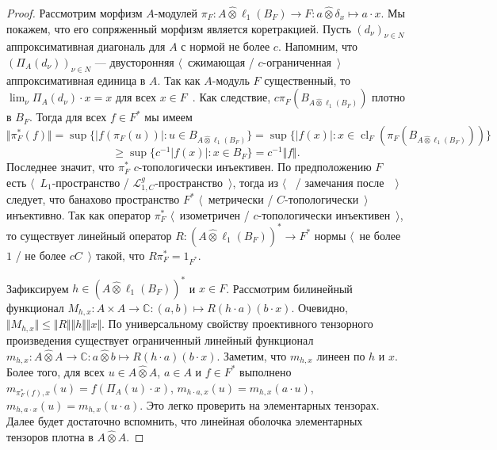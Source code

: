 \documentclass[12pt]{article}
\newcommand{\projtens}{\mathbin{\widehat{\otimes}}}
\begin{document}
\begin{proof} Рассмотрим морфизм $A$-модулей $\pi_F:A\projtens \ell_1(B_F)\to
F:a\projtens \delta_x\mapsto a\cdot x$. Мы покажем, что его сопряженный морфизм
является коретракцией. Пусть ${(d_\nu)}_{\nu\in N}$ аппроксимативная диагональ
для $A$ с нормой не более $c$. Напомним, что ${(\Pi_A(d_\nu))}_{\nu\in N}$ ---
двусторонняя $\langle$~сжимающая / $c$-ограниченная~$\rangle$ аппроксимативная
единица в $A$. Так как $A$-модуль $F$ существенный, то
$\lim_{\nu}\Pi_A(d_\nu)\cdot x=x$ для всех $x\in F$~\cite[предложение
0.3.15]{HelHomolBanTopAlg}. Как следствие, $c\pi_F(B_{A\projtens\ell_1(B_F)})$
плотно в $B_F$. Тогда для всех $f\in F^*$ мы имеем
\[
\Vert\pi_F^*(f)\Vert
=\sup \{|f(\pi_F(u))|:u\in B_{A\projtens\ell_1(B_F)} \}
=\sup \{|f(x)|:x\in \operatorname{cl}_F(\pi_F(B_{A\projtens\ell_1(B_F)})) \}
\]
\[
\geq\sup \{c^{-1}|f(x)|:x\in B_F \}=c^{-1}\Vert f\Vert.
\]
Последнее значит, что $\pi_F^*$ $c$-топологически инъективен. По предположению
$F$ есть $\langle$~$L_1$-пространство /
$\mathcal{L}_{1,C}^g$-пространство~$\rangle$, тогда из $\langle$~\cite[теорема
1]{GrothMetrProjFlatBanSp} / замечания после~\cite[следствие
23.5(1)]{DefFloTensNorOpId}~$\rangle$ следует, что банахово пространство $F^*$
$\langle$~метрически / $C$-топологически~$\rangle$ инъективно. Так как оператор
$\pi_F^*$ $\langle$~изометричен / $c$-топологически инъективен~$\rangle$, то
существует линейный оператор $R:{(A\projtens\ell_1(B_F))}^*\to F^*$ нормы
$\langle$~не более $1$ / не более $cC$~$\rangle$ такой, что $R\pi_F^*=1_{F^*}$.

Зафиксируем $h\in {(A\projtens\ell_1(B_F))}^*$ и $x\in F$. Рассмотрим билинейный
функционал $M_{h,x}:A\times A\to\mathbb{C}:(a,b)\mapsto R(h\cdot a)(b\cdot x)$.
Очевидно, $\Vert M_{h,x}\Vert\leq\Vert R\Vert\Vert h\Vert\Vert x\Vert$. По
универсальному свойству проективного тензорного произведения существует
ограниченный линейный функционал $m_{h,x}:A\projtens A\to\mathbb{C}:a\projtens
b\mapsto R(h\cdot a)(b\cdot x)$. Заметим, что $m_{h,x}$ линеен по $h$ и $x$.
Более того, для всех $u\in A\projtens A$, $a\in A$ и $f\in F^*$ выполнено
$m_{\pi_F^*(f),x}(u)=f(\Pi_A(u)\cdot x)$, $m_{h\cdot a,x}(u)=m_{h,x}(a\cdot u)$,
$m_{h,a\cdot x}(u)=m_{h,x}(u\cdot a)$. Это легко проверить на элементарных
тензорах. Далее будет достаточно вспомнить, что линейная оболочка элементарных
тензоров плотна в $A\projtens A$.


\end{proof}
\end{document}
